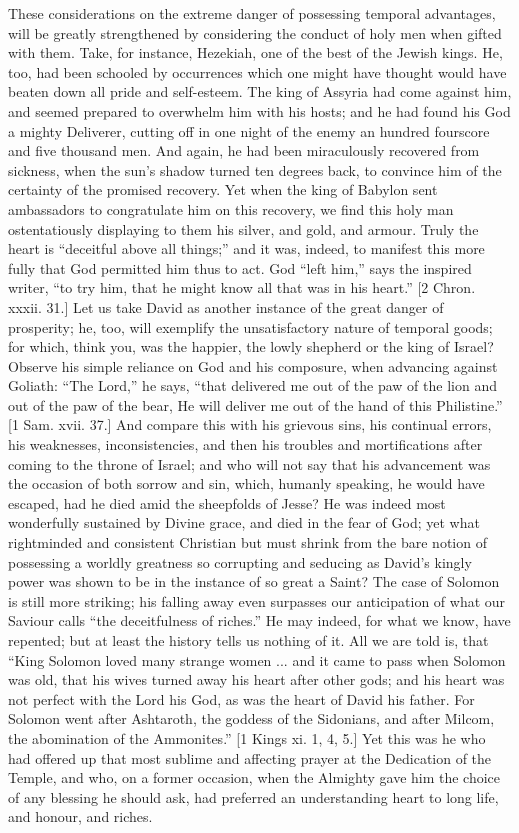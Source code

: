These considerations on the extreme danger of possessing temporal
advantages, will be greatly strengthened by considering the conduct of
holy men when gifted with them. Take, for instance, Hezekiah, one of
the best of the Jewish kings. He, too, had been schooled by
occurrences which one might have thought would have beaten down all
pride and self-esteem. The king of Assyria had come against him, and
seemed prepared to overwhelm him with his hosts; and he had found his
God a mighty Deliverer, cutting off in one night of the enemy an
hundred fourscore and five thousand men. And again, he had been
miraculously recovered from sickness, when the sun's shadow turned ten
degrees back, to convince him of the certainty of the promised
recovery. Yet when the king of Babylon sent ambassadors to
congratulate him on this recovery, we find this holy man
ostentatiously displaying to them his silver, and gold, and armour.
Truly the heart is ``deceitful above all things;'' and it was,
indeed, to manifest this more fully that God permitted him thus to
act. God ``left him,'' says the inspired writer, ``to try
him, that he might know all that was in his heart.'' [2 Chron.
xxxii. 31.] Let us take David as another instance of the great danger
of prosperity; he, too, will exemplify the unsatisfactory nature of
temporal goods; for which, think you, was the happier, the lowly
shepherd or the king of Israel? Observe his simple reliance on God and
his composure, when advancing against Goliath: ``The Lord,''
he says, ``that delivered me out of the paw of the lion and out of
the paw of the bear, He will deliver me out of the hand of this
Philistine.'' [1 Sam. xvii. 37.] And compare this with his
grievous sins, his continual errors, his weaknesses, inconsistencies,
and then his troubles and mortifications after coming to the throne of
Israel; and who will not say that his advancement was the occasion of
both sorrow and sin, which, humanly speaking, he would have escaped,
had he died amid the sheepfolds of Jesse? He was indeed most
wonderfully sustained by Divine grace, and died in the fear of God;
yet what rightminded and consistent Christian but must shrink from the
bare notion of possessing a worldly greatness so corrupting and
seducing as David's kingly power was shown to be in the instance of so
great a Saint? The case of Solomon is still more striking; his falling
away even surpasses our anticipation of what our Saviour calls
``the deceitfulness of riches.'' He may indeed, for what we
know, have repented; but at least the history tells us nothing of it.
All we are told is, that ``King Solomon loved many strange women
... and it came to pass when Solomon was old, that his wives turned
away his heart after other gods; and his heart was not perfect with
the Lord his God, as was the heart of David his father. For Solomon
went after Ashtaroth, the goddess of the Sidonians, and after Milcom,
the abomination of the Ammonites.'' [1 Kings xi. 1, 4, 5.] Yet
this was he who had offered up that most sublime and affecting prayer
at the Dedication of the Temple, and who, on a former occasion, when
the Almighty gave him the choice of any blessing he should ask, had
preferred an understanding heart to long life, and honour, and riches.

